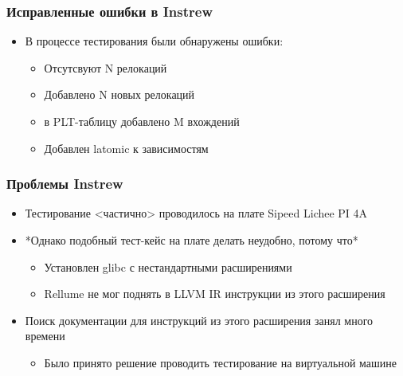 \documentclass{beamer}
\begin{document}
\begin{frame}[fragile]
	\frametitle{Исправленные ошибки в Instrew}
	\begin{itemize}
		\item В процессе тестирования были обнаружены ошибки:
		      \begin{itemize}
			      \item Отсутсвуют N релокаций
			      \item Добавлено N новых релокаций
			      \item в PLT-таблицу добавлено M вхождений
			      \item Добавлен latomic к зависимостям
		      \end{itemize}
	\end{itemize}
\end{frame}

\begin{frame}[fragile]
	\frametitle{Проблемы Instrew}
	\begin{itemize}
		\item Тестирование <частично> проводилось на плате Sipeed Lichee PI 4A
		\item *Однако подобный тест-кейс на плате делать неудобно, потому что*
		      \begin{itemize}
			      \item Установлен glibc с нестандартными расширениями
			      \item Rellume не мог поднять в LLVM IR инструкции из этого расширения
		      \end{itemize}
		\item Поиск документации для инструкций из этого расширения занял много времени
		      \begin{itemize}
			      \item Было принято решение проводить тестирование на виртуальной машине
		      \end{itemize}
	\end{itemize}
\end{frame}
\end{document}
